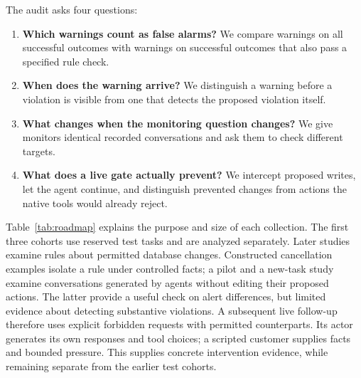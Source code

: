 \documentclass[10pt]{article}
\begin{document}
The audit asks four questions:
\begin{enumerate}
\item \textbf{Which warnings count as false alarms?} We compare warnings on all successful outcomes with warnings on successful outcomes that also pass a specified rule check.
\item \textbf{When does the warning arrive?} We distinguish a warning before a violation is visible from one that detects the proposed violation itself.
\item \textbf{What changes when the monitoring question changes?} We give monitors identical recorded conversations and ask them to check different targets.
\item \textbf{What does a live gate actually prevent?} We intercept proposed writes, let the agent continue, and distinguish prevented changes from actions the native tools would already reject.
\end{enumerate}

Table~\ref{tab:roadmap} explains the purpose and size of each collection. The first three cohorts use reserved test tasks and are analyzed separately. Later studies examine rules about permitted database changes. Constructed cancellation examples isolate a rule under controlled facts; a pilot and a new-task study examine conversations generated by agents without editing their proposed actions. The latter provide a useful check on alert differences, but limited evidence about detecting substantive violations. A subsequent live follow-up therefore uses explicit forbidden requests with permitted counterparts. Its actor generates its own responses and tool choices; a scripted customer supplies facts and bounded pressure. This supplies concrete intervention evidence, while remaining separate from the earlier test cohorts.
\end{document}
